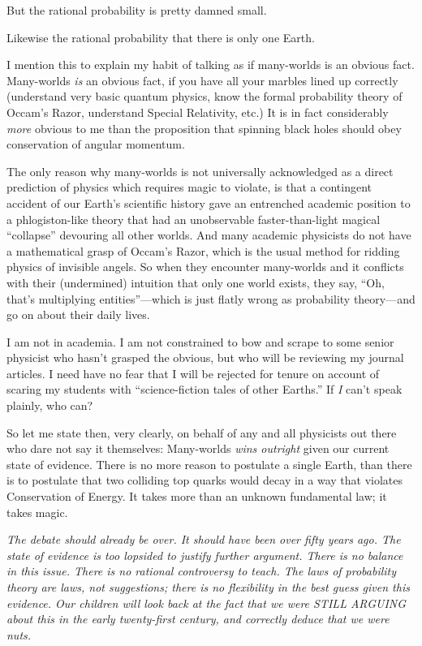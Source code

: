{
 But the rational probability is pretty damned small.}

{
 Likewise the rational probability that there is only one Earth.}

{
 I mention this to explain my habit of talking as if many-worlds is
an obvious fact. Many-worlds \textit{is} an obvious fact, if you have
all your marbles lined up correctly (understand very basic quantum
physics, know the formal probability theory of Occam's
Razor, understand Special Relativity, etc.) It is in fact considerably
\textit{more} obvious to me than the proposition that spinning black
holes should obey conservation of angular momentum.}

{
 The only reason why many-worlds is not universally acknowledged as
a direct prediction of physics which requires magic to violate, is that
a contingent accident of our Earth's scientific history
gave an entrenched academic position to a phlogiston-like theory that
had an unobservable faster-than-light magical
``collapse'' devouring all other
worlds. And many academic physicists do not have a mathematical grasp
of Occam's Razor, which is the usual method for ridding
physics of invisible angels. So when they encounter many-worlds and it
conflicts with their (undermined) intuition that only one world exists,
they say, ``Oh, that's multiplying
entities''---which is just flatly wrong as
probability theory---and go on about their daily lives.}

{
 I am not in academia. I am not constrained to bow and scrape to
some senior physicist who hasn't grasped the obvious,
but who will be reviewing my journal articles. I need have no fear that
I will be rejected for tenure on account of scaring my students with
``science-fiction tales of other
Earths.'' If \textit{I} can't speak
plainly, who can?}

{
 So let me state then, very clearly, on behalf of any and all
physicists out there who dare not say it themselves: Many-worlds
\textit{wins outright} given our current state of evidence. There is no
more reason to postulate a single Earth, than there is to postulate
that two colliding top quarks would decay in a way that violates
Conservation of Energy. It takes more than an unknown fundamental law;
it takes magic.}

{
 \textit{The debate should already be over. It should have been
over fifty years ago. The state of evidence is too lopsided to justify
further argument. There is no balance in this issue. There is no
rational controversy to teach. The laws of probability theory are laws,
not suggestions; there is no flexibility in the best guess given this
evidence. Our children will look back at the fact that we were STILL
ARGUING about this in the early twenty-first century, and correctly
deduce that we were nuts.}}

